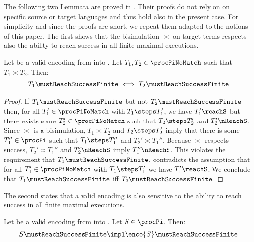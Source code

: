 \documentclass[]{article}
\begin{document}
The following two Lemmata are proved in \cite{petphd}. Their proofs do not rely on on specific source or target languages and thus hold also in the present case. For simplicity and since the proofs are short, we repeat them adapted to the notions of this paper. The first shows that the bisimulation $ \asymp $ on target terms respects also the ability to reach success in all finite maximal executions.

\begin{lemma}
	\label{lem:mustSuccessRespecting}
	Let \encod be a valid encoding from \piT into \piNM.
	Let $ T_1, T_2 \in \procPiNoMatch $ such that $ T_1 \asymp T_2 $.
	Then:
	\begin{align*}
		T_1 \mustReachSuccessFinite \iff T_2 \mustReachSuccessFinite
	\end{align*}
\end{lemma}

\begin{proof}
	If $ T_1\mustReachSuccessFinite $ but not $ T_2 \mustReachSuccessFinite $ then, for all $ T_1' \in \procPiNoMatch $ with $ T_1 \steps T_1' $, we have $ T_1' \reachS $ but there exists some $ T_2' \in \procPiNoMatch $ such that $ T_2 \steps T_2' $ and $ T_2' \nReachS $.
	Since $ \asymp $ is a bisimulation, $ T_1 \asymp T_2 $ and $ T_2 \steps T_2' $ imply that there is some $ T_1'' \in \procPi $ such that $ T_1 \steps T_1'' $ and $ T_2' \asymp T_1'' $.
	Because $ \asymp $ respects success, $ T_2' \asymp T_1'' $ and $ T_2' \nReachS $ imply $ T_1'' \nReachS $.
	This violates the requirement that $ T_1 \mustReachSuccessFinite $, \ie contradicts the assumption that for all $ T_1' \in \procPiNoMatch $ with $ T_1 \steps T_1' $ we have $ T_1' \reachS $.
	We conclude that $ T_1\mustReachSuccessFinite $ iff $ T_2\mustReachSuccessFinite $.
\end{proof}

The second states that a valid encoding is also sensitive to the ability to reach success in all finite maximal executions.

\begin{lemma}
	\label{lem:mustSuccessSensitiveness}
	Let \encod be a valid encoding from \piT into \piNM.
	Let $ S \in \procPi $.
	Then:
	\begin{align*}
		S \mustReachSuccessFinite \impl \enco{S} \mustReachSuccessFinite
	\end{align*}
\end{lemma}
\end{document}
